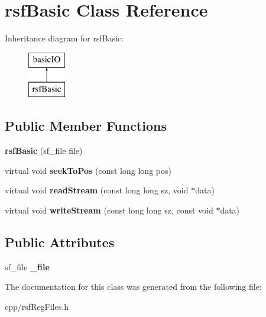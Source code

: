 \hypertarget{classrsf_basic}{}\section{rsf\+Basic Class Reference}
\label{classrsf_basic}
Inheritance diagram for rsf\+Basic\+:\begin{figure}[H]
\begin{center}
\leavevmode
\includegraphics[height=2.000000cm]{classrsf_basic}
\end{center}
\end{figure}
\subsection*{Public Member Functions}
\begin{DoxyCompactItemize}
\item 
\mbox{\label{classrsf_basic_af73002ff7e733932f7854bb99c1ddc63}} 
{\bfseries rsf\+Basic} (sf\+\_\+file file)
\item 
\mbox{\label{classrsf_basic_a10e1925a64d0ebc768e221e7cb11f0de}} 
virtual void {\bfseries seek\+To\+Pos} (const long long pos)
\item 
\mbox{\label{classrsf_basic_ad347fd1cdb5ac78a5e6517c8180cb392}} 
virtual void {\bfseries read\+Stream} (const long long sz, void $\ast$data)
\item 
\mbox{\label{classrsf_basic_aa94ace1e785c2d8ec49d3118611604ce}} 
virtual void {\bfseries write\+Stream} (const long long sz, const void $\ast$data)
\end{DoxyCompactItemize}
\subsection*{Public Attributes}
\begin{DoxyCompactItemize}
\item 
\mbox{\label{classrsf_basic_adfdbc3295c624f7bbf2044132655e18c}} 
sf\+\_\+file {\bfseries \+\_\+file}
\end{DoxyCompactItemize}


The documentation for this class was generated from the following file\+:\begin{DoxyCompactItemize}
\item 
cpp/rsf\+Reg\+Files.\+h\end{DoxyCompactItemize}

